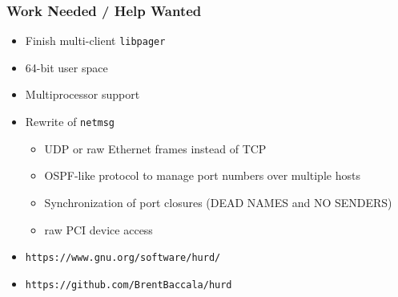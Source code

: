 \documentclass{beamer}
\begin{document}
\begin{frame}
\frametitle{Work Needed / Help Wanted}
\begin{itemize}
\item Finish multi-client {\tt libpager}
\item 64-bit user space
\item Multiprocessor support
\item Rewrite of {\tt netmsg}
\begin{itemize}
\item UDP or raw Ethernet frames instead of TCP
\item OSPF-like protocol to manage port numbers over multiple hosts
\item Synchronization of port closures (DEAD NAMES and NO SENDERS)
\item raw PCI device access
\end{itemize}
\vskip 0.5in
\item {\tt https://www.gnu.org/software/hurd/}
\item {\tt https://github.com/BrentBaccala/hurd}
\end{itemize}
\end{frame}


\end{document}
